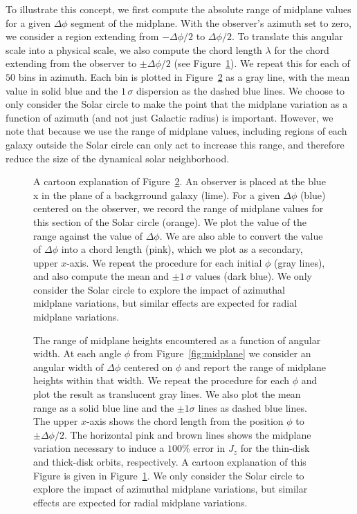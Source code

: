 \documentclass[twocolumn]{aastex62}
\newcommand{\thincolor}{pink}
\newcommand{\thickcolor}{brown}
\begin{document}
To illustrate this concept, we first compute the absolute range of midplane
values for a given $\Delta \phi$ segment of the midplane. With the observer's
azimuth set to zero, we consider a region extending from $-\Delta \phi/2$ to
$\Delta\phi/2$. To translate this angular scale into a physical scale, we also
compute the chord length $\lambda$ for the chord extending from the observer
to $\pm \Delta\phi/2$ (see Figure~\ref{fig:fig_to_explain}). We repeat this
for each of $50$ bins in azimuth. Each bin is plotted in
Figure~\ref{fig:range_deltaphi} as a gray line, with the mean value in solid
blue and the $1\,\sigma$ dispersion as the dashed blue lines. We choose to
only consider the Solar circle to make the point that the midplane variation
as a function of azimuth (and not just Galactic radius) is important. However,
we note that because we use the range of midplane values, including regions of
each galaxy outside the Solar circle can only act to increase this range, and
therefore reduce the size of the dynamical solar neighborhood.

\begin{figure}
\caption{A cartoon explanation of Figure~\ref{fig:range_deltaphi}. An observer
is placed at the blue x in the plane of a backgrround galaxy (lime). For a
given $\Delta \phi$ (blue) centered on the observer, we record the range of
midplane values for this section of the Solar circle (orange). We plot the
value of the range against the value of $\Delta \phi$. We are also able to
convert the value of $\Delta \phi$ into a chord length (pink), which we plot
as a secondary, upper $x$-axis. We repeat the procedure for each initial
$\phi$ (gray lines), and also compute the mean and $\pm1\,\sigma$ values (dark
blue). We only consider the Solar circle to explore the impact of azimuthal
midplane variations, but similar effects are expected for radial midplane
variations.}
\label{fig:fig_to_explain}
\end{figure}

\begin{figure}
\caption{The range of midplane heights encountered as a function of angular
width. At each angle $\phi$ from Figure~\ref{fig:midplane} we consider an
angular width of $\Delta \phi$ centered on $\phi$ and report the range of
midplane heights within that width. We repeat the procedure for each $\phi$
and plot the result as translucent gray lines. We also plot the mean range as
a solid blue line and the $\pm1\sigma$ lines as dashed blue lines. The upper
$x$-axis shows the chord length from the position $\phi$ to $\pm\Delta\phi/2$.
The horizontal \thincolor{} and \thickcolor{} lines shows the midplane
variation necessary to induce a $100\%$ error in $J_z$ for the thin-disk and
thick-disk orbits, respectively. A cartoon explanation of this Figure is given
in Figure~\ref{fig:fig_to_explain}. We only consider the Solar circle to
explore the impact of azimuthal midplane variations, but similar effects are
expected for radial midplane variations.}
\label{fig:range_deltaphi}
\end{figure}
\end{document}
